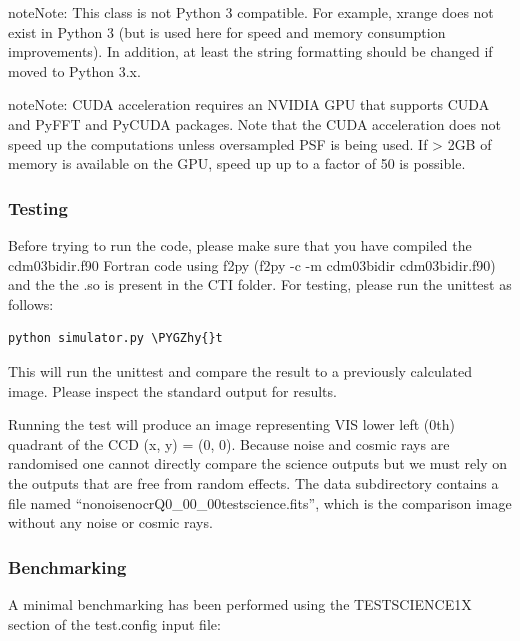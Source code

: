 \documentclass[a4paper,11pt,english]{sphinxmanual}
\def\PYGZhy{\char`\-}
\begin{document}
\begin{notice}{note}{Note:}
This class is not Python 3 compatible. For example, xrange does not exist
in Python 3 (but is used here for speed and memory consumption improvements).
In addition, at least the string formatting should be changed if moved to
Python 3.x.
\end{notice}

\begin{notice}{note}{Note:}
CUDA acceleration requires an NVIDIA GPU that supports CUDA and PyFFT and PyCUDA packages.
Note that the CUDA acceleration does not speed up the computations unless oversampled PSF
is being used. If \textgreater{} 2GB of memory is available on the GPU, speed up up to a factor of 50 is
possible.
\end{notice}


\subsubsection{Testing}
\label{simulator:testing}
Before trying to run the code, please make sure that you have compiled the
cdm03bidir.f90 Fortran code using f2py (f2py -c -m cdm03bidir cdm03bidir.f90) and the the .so is present in
the CTI folder. For testing,
please run the unittest as follows:

\begin{Verbatim}[commandchars=\\\{\}]
python simulator.py \PYGZhy{}t
\end{Verbatim}

This will run the unittest and compare the result to a previously calculated image.
Please inspect the standard output for results.

Running the test will produce an image representing VIS lower left (0th) quadrant of the CCD (x, y) = (0, 0). Because
noise and cosmic rays are randomised one cannot directly compare the science
outputs but we must rely on the outputs that are free from random effects. The data subdirectory
contains a file named ``nonoisenocrQ0\_00\_00testscience.fits'', which is the comparison image without
any noise or cosmic rays.


\subsubsection{Benchmarking}
\label{simulator:benchmarking}
A minimal benchmarking has been performed using the TESTSCIENCE1X section of the test.config input file:
\end{document}
